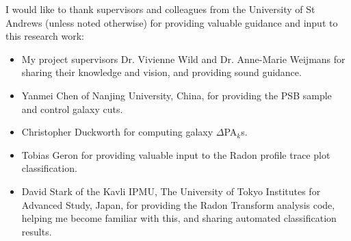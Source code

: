 
I would like to thank supervisors and colleagues from the University of St Andrews (unless noted otherwise) for providing valuable guidance and input to this research work:
\begin{itemize}
    \item My project supervisors Dr. Vivienne Wild and Dr. Anne-Marie Weijmans for sharing their knowledge and vision, and providing sound guidance. 
    \item Yanmei Chen of Nanjing University, China, for providing the PSB sample and control galaxy cuts.
    \item Christopher Duckworth for computing galaxy $\Delta$PA$_{k}$s.
    \item Tobias Geron for providing valuable input to the Radon profile trace plot classification.
    \item David Stark of the Kavli IPMU, The University of Tokyo Institutes for Advanced Study, Japan, for providing the Radon Transform analysis code, helping me become familiar with this, and sharing automated classification results.
\end{itemize}
